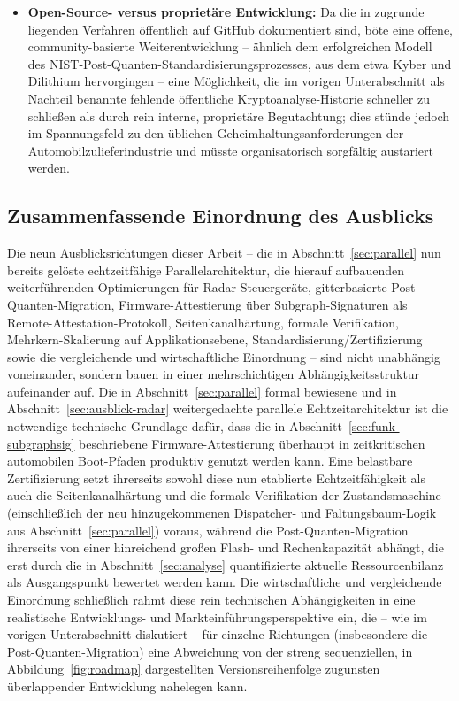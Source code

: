 ﻿\documentclass[a4paper,12pt]{article}
\theoremstyle{definition}
\begin{document}
\begin{itemize}
	\item \textbf{Open-Source- versus proprietäre Entwicklung:} Da die in \cite{Epp26a,Epp26b,Epp26c,Epp26d} zugrunde liegenden Verfahren öffentlich auf GitHub dokumentiert sind, böte eine offene, community-basierte Weiterentwicklung -- ähnlich dem erfolgreichen Modell des NIST-Post-Quanten-Standardisierungsprozesses, aus dem etwa Kyber und Dilithium hervorgingen -- eine Möglichkeit, die im vorigen Unterabschnitt als Nachteil benannte fehlende öffentliche Kryptoanalyse-Historie schneller zu schließen als durch rein interne, proprietäre Begutachtung; dies stünde jedoch im Spannungsfeld zu den üblichen Geheimhaltungsanforderungen der Automobilzulieferindustrie und müsste organisatorisch sorgfältig austariert werden.
\end{itemize}

\subsection{Zusammenfassende Einordnung des Ausblicks}
\label{sec:ausblick-einordnung}

Die neun Ausblicksrichtungen dieser Arbeit -- die in Abschnitt~\ref{sec:parallel} nun bereits gelöste echtzeitfähige Parallelarchitektur, die hierauf aufbauenden weiterführenden Optimierungen für Radar-Steuergeräte, gitterbasierte Post-Quanten-Migration, Firmware-Attestierung über Subgraph-Signaturen als Remote-Attestation-Protokoll, Seitenkanalhärtung, formale Verifikation, Mehrkern-Skalierung auf Applikationsebene, Standardisierung/Zertifizierung sowie die vergleichende und wirtschaftliche Einordnung -- sind nicht unabhängig voneinander, sondern bauen in einer mehrschichtigen Abhängigkeitsstruktur aufeinander auf. Die in Abschnitt~\ref{sec:parallel} formal bewiesene und in Abschnitt~\ref{sec:ausblick-radar} weitergedachte parallele Echtzeitarchitektur ist die notwendige technische Grundlage dafür, dass die in Abschnitt~\ref{sec:funk-subgraphsig} beschriebene Firmware-Attestierung überhaupt in zeitkritischen automobilen Boot-Pfaden produktiv genutzt werden kann. Eine belastbare Zertifizierung setzt ihrerseits sowohl diese nun etablierte Echtzeitfähigkeit als auch die Seitenkanalhärtung und die formale Verifikation der Zustandsmaschine (einschließlich der neu hinzugekommenen Dispatcher- und Faltungsbaum-Logik aus Abschnitt~\ref{sec:parallel}) voraus, während die Post-Quanten-Migration ihrerseits von einer hinreichend großen Flash- und Rechenkapazität abhängt, die erst durch die in Abschnitt~\ref{sec:analyse} quantifizierte aktuelle Ressourcenbilanz als Ausgangspunkt bewertet werden kann. Die wirtschaftliche und vergleichende Einordnung schließlich rahmt diese rein technischen Abhängigkeiten in eine realistische Entwicklungs- und Markteinführungsperspektive ein, die -- wie im vorigen Unterabschnitt diskutiert -- für einzelne Richtungen (insbesondere die Post-Quanten-Migration) eine Abweichung von der streng sequenziellen, in Abbildung~\ref{fig:roadmap} dargestellten Versionsreihenfolge zugunsten überlappender Entwicklung nahelegen kann.
\end{document}
